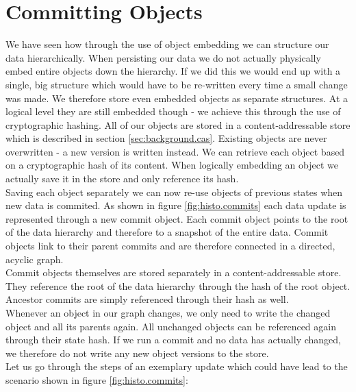 
\section{Committing Objects}
\label{sec:histo.committing}
We have seen how through the use of object embedding we can structure our data hierarchically.
When persisting our data we do not actually physically embed entire objects down the hierarchy.
If we did this we would end up with a single, big structure which would have to be re-written every time a small change was made.
We therefore store even embedded objects as separate structures.
At a logical level they are still embedded though - we achieve this through the use of cryptographic hashing.
All of our objects are stored in a content-addressable store which is described in section \ref{sec:background.cas}.
Existing objects are never overwritten - a new version is written instead.
We can retrieve each object based on a cryptographic hash of its content.
When logically embedding an object we actually save it in the store and only reference its hash.\\
Saving each object separately we can now re-use objects of previous states when new data is commited.
As shown in figure \ref{fig:histo.commits} each data update is represented through a new commit object.
Each commit object points to the root of the data hierarchy and therefore to a snapshot of the entire data.
Commit objects link to their parent commits and are therefore connected in a directed, acyclic graph.\\
Commit objects themselves are stored separately in a content-addressable store.
They reference the root of the data hierarchy through the hash of the root object.
Ancestor commits are simply referenced through their hash as well.\\
Whenever an object in our graph changes, we only need to write the changed object and all its parents again.
All unchanged objects can be referenced again through their state hash.
If we run a commit and no data has actually changed, we therefore do not write any new object versions to the store.\\

Let us go through the steps of an exemplary update which could have lead to the scenario shown in figure \ref{fig:histo.commits}:

